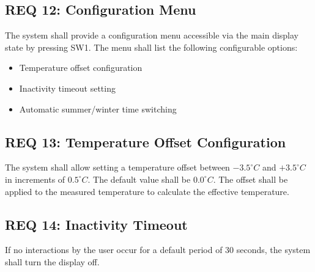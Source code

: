 \subsection*{REQ 12: Configuration Menu}
\label{subsec:REQ 12: Configuration Menu}
The system shall provide a configuration menu accessible via the main display state by pressing SW1. The menu shall list the following configurable options:
\begin{itemize}
    \item Temperature offset configuration
    \item Inactivity timeout setting
    \item Automatic summer/winter time switching
\end{itemize}

\subsection*{REQ 13: Temperature Offset Configuration}
\label{subsec:REQ 13: Temperature Offset Configuration}
The system shall allow setting a temperature offset between $-3.5^\circ C$ and $+3.5^\circ C$ in increments of $0.5^\circ C$. The default value shall be $0.0^\circ C$. The offset shall be applied to the measured temperature to calculate the effective temperature.

\subsection*{REQ 14: Inactivity Timeout}
\label{subsec:REQ 14: Inactivity Timeout}
If no interactions by the user occur for a default period of 30 seconds, the system shall turn the display off.


